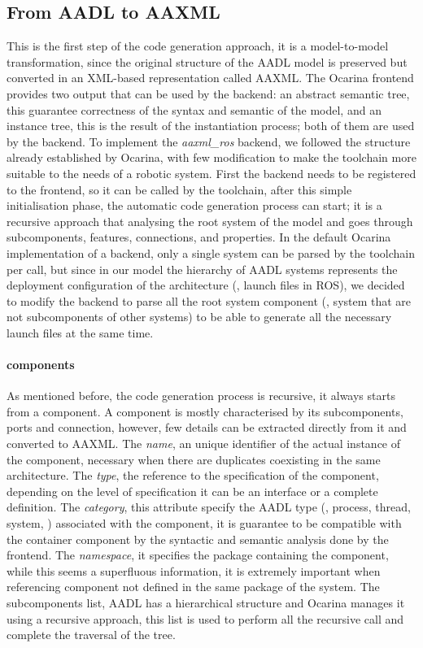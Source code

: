 \subsection{From AADL to AAXML}
\label{sec:aadl-to-aaxml}
This is the first step of the code generation approach, it is a model-to-model transformation, since the original structure of the AADL model is preserved but converted in an XML-based representation called AAXML. The Ocarina frontend provides two output that can be used by the backend: an abstract semantic tree, this guarantee correctness of the syntax and semantic of the model, and an instance tree, this is the result of the instantiation process; both of them are used by the backend. To implement the \textit{aaxml\_ros} backend, we followed the structure already established by Ocarina, with few modification to make the toolchain more suitable to the needs of a robotic system. First the backend needs to be registered to the frontend, so it can be called by the toolchain, after this simple initialisation phase, the automatic code generation process can start; it is a recursive approach that  analysing the root system of the model and goes through subcomponents, features, connections, and properties. In the default Ocarina implementation of a backend, only a single system can be parsed by the toolchain per call, but since in our model the hierarchy of AADL systems represents the deployment configuration of the architecture (\ie, launch files in ROS), we decided to modify the backend to parse all the root system component (\ie, system that are not subcomponents of other systems) to be able to generate all the necessary launch files at the same time.

\paragraph{components} As mentioned before, the code generation process is recursive, it always starts from a component. A component is mostly characterised by its subcomponents, ports and connection, however, few details can be extracted directly from it and converted to AAXML. The \textit{name}, an unique identifier of the actual instance of the component, necessary when there are duplicates coexisting in the same architecture. The \textit{type}, the reference to the specification of the component, depending on the level of specification it can be an interface or a complete definition. The \textit{category}, this attribute specify the AADL type (\eg, process, thread, system, \etc) associated with the component, it is guarantee to be compatible with the container component by the syntactic and semantic analysis done by the frontend. The \textit{namespace}, it specifies the package containing the component, while this seems a superfluous information, it is extremely important when referencing component not defined in the same package of the system. The subcomponents list, AADL has a hierarchical structure and Ocarina manages it using a recursive approach, this list is used to perform all the recursive call and complete the traversal of the tree.

